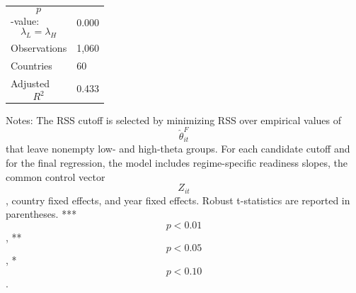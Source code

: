 \begin{table}[H]
\begin{threeparttable}
\begin{tabularx}{\textwidth}{lY}
$$p$$-value: $$\lambda_L=\lambda_H$$ & 0.000 \\
Observations & 1,060 \\
Countries & 60 \\
Adjusted $$R^2$$ & 0.433 \\
\bottomrule
\end{tabularx}
\begin{tablenotes}[flushleft]\footnotesize
\item Notes: The RSS cutoff is selected by minimizing RSS over empirical values of $$\widehat{\theta}^{F}_{it}$$ that leave nonempty low- and high-theta groups. For each candidate cutoff and for the final regression, the model includes regime-specific readiness slopes, the common control vector $$Z_{it}$$, country fixed effects, and year fixed effects. Robust t-statistics are reported in parentheses. *** $$p<0.01$$, ** $$p<0.05$$, * $$p<0.10$$.
\end{tablenotes}
\end{threeparttable}
\end{table}
